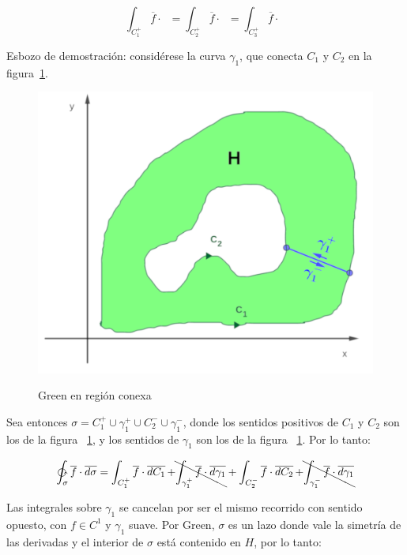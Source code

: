 \documentclass{article}
\begin{document}
\begin{enumerate}
\begin{equation}
\int_{C_1^+} \overline{f} \cdot \mathop{\overline{dC_1}} = \int_{C_2^+} \overline{f} \cdot \mathop{\overline{dC_2}} = \int_{C_3^+} \overline{f} \cdot \mathop{\overline{dC_3}}
\end{equation}

Esbozo de demostración: considérese la curva $\gamma_1$, que conecta $C_1$ y $C_2$ en la figura~\ref{fig:green32}.

\begin{figure}[ht]
\centering
\caption{Green en región conexa}
\includegraphics[scale=1]{img/teo_fig032_green.png}
\label{fig:green32}
\end{figure}

Sea entonces $\sigma = C_1^+ \cup \gamma_1^+ \cup C_2^- \cup \gamma_1^-$, donde los sentidos positivos de $C_1$ y $C_2$ son los de la figura ~\ref{fig:green32}, y los sentidos de $\gamma_1$ son los de la figura ~\ref{fig:green32}. Por lo tanto:

\begin{equation}
\ointctrclockwise_{\sigma} \overline{f} \cdot \mathop{\overline{d\sigma}} = \int_{C_1^+} \overline{f} \cdot \mathop{\overline{dC_1}} + \bcancel{ \int_{\gamma_1^+} \overline{f} \cdot \mathop{\overline{d\gamma_1}} } + \int_{C_2^-} \overline{f} \cdot \mathop{\overline{dC_2}} + \bcancel{ \int_{\gamma_1^-} \overline{f} \cdot \mathop{\overline{d\gamma_1}} }
\end{equation}

Las integrales sobre $\gamma_1$ se cancelan por ser el mismo recorrido con sentido opuesto, con $f \in C^1$ y $\gamma_1$ suave. Por Green, $\sigma$ es un lazo donde vale la simetría de las derivadas y el interior de $\sigma$ está contenido en $H$, por lo tanto:


\end{enumerate}
\end{document}
